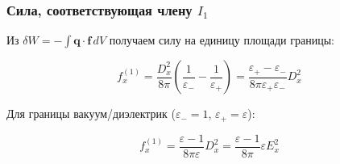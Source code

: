 \documentclass[a4paper,10pt]{article}
\newcommand{\modblock}[1]{\colorbox{modcolor!10}{\parbox{\dimexpr\linewidth-2\fboxsep}{#1}}}
\begin{document}
\modblock{
\subsubsection{Сила, соответствующая члену $I_1$}

Из $\delta W = -\int\mathbf{q}\cdot\mathbf{f}\,dV$ получаем силу на единицу
площади границы:

\begin{equation}
\boxed{
f_x^{(1)} = \frac{D_x^2}{8\pi}\left(\frac{1}{\varepsilon_-} - \frac{1}{\varepsilon_+}\right)
= \frac{\varepsilon_+ - \varepsilon_-}{8\pi\varepsilon_+\varepsilon_-}D_x^2
}
\label{eq:force_term_1}
\end{equation}

}%

\modblock{

Для границы вакуум/диэлектрик ($\varepsilon_- = 1$, $\varepsilon_+ = \varepsilon$):

\begin{equation}
f_x^{(1)} = \frac{\varepsilon - 1}{8\pi\varepsilon}D_x^2 =
\frac{\varepsilon - 1}{8\pi}\varepsilon E_x^2
\label{eq:force_term_1_vacuum_dielectric}
\end{equation}

}%
\end{document}
